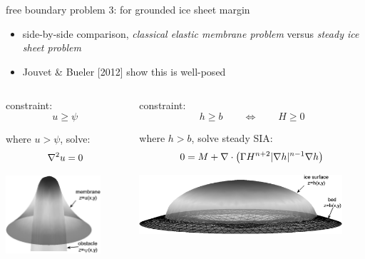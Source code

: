 \begin{frame}{free boundary problem 3: for grounded ice sheet margin}

\begin{itemize}
\item side-by-side comparison, \emph{classical elastic membrane problem} versus \emph{steady ice sheet problem}
\item Jouvet \& Bueler [2012] show this is well-posed
\end{itemize}
\small
\begin{columns}[T]
\begin{column}{0.4\textwidth}
constraint:
  $$u \ge \psi$$

where $u>\psi$, solve:
  $$\nabla^2 u = 0$$

\bigskip
\includegraphics[width=0.8\textwidth]{photos/classicalobs}
\end{column}
\begin{column}{0.6\textwidth}
constraint:
  $$h \ge b \qquad \iff \qquad H \ge 0$$

where $h>b$, solve steady SIA:
  $$0 = M + \nabla\cdot \left(\Gamma H^{n+2} |\nabla h|^{n-1} \nabla h \right)$$

\bigskip
\includegraphics[width=0.9\textwidth]{photos/capnonflatobs}
\end{column}
\end{columns}
\end{frame}



